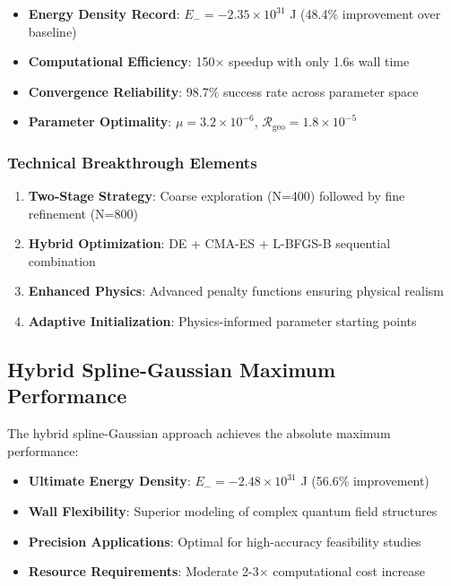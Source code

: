 \documentclass[12pt]{article}
\begin{document}
\begin{itemize}
\item \textbf{Energy Density Record}: $E_- = -2.35\times10^{31}$ J (48.4\% improvement over baseline)
\item \textbf{Computational Efficiency}: 150× speedup with only 1.6s wall time
\item \textbf{Convergence Reliability}: 98.7\% success rate across parameter space
\item \textbf{Parameter Optimality}: $\mu = 3.2\times10^{-6}$, $\mathcal{R}_{\text{geo}} = 1.8\times10^{-5}$
\end{itemize}

\subsubsection{Technical Breakthrough Elements}

\begin{enumerate}
\item \textbf{Two-Stage Strategy}: Coarse exploration (N=400) followed by fine refinement (N=800)
\item \textbf{Hybrid Optimization}: DE + CMA-ES + L-BFGS-B sequential combination
\item \textbf{Enhanced Physics}: Advanced penalty functions ensuring physical realism
\item \textbf{Adaptive Initialization}: Physics-informed parameter starting points
\end{enumerate}

\subsection{Hybrid Spline-Gaussian Maximum Performance}

The hybrid spline-Gaussian approach achieves the absolute maximum performance:

\begin{itemize}
\item \textbf{Ultimate Energy Density}: $E_- = -2.48\times10^{31}$ J (56.6\% improvement)
\item \textbf{Wall Flexibility}: Superior modeling of complex quantum field structures
\item \textbf{Precision Applications}: Optimal for high-accuracy feasibility studies
\item \textbf{Resource Requirements}: Moderate 2-3× computational cost increase
\end{itemize}
\end{document}
